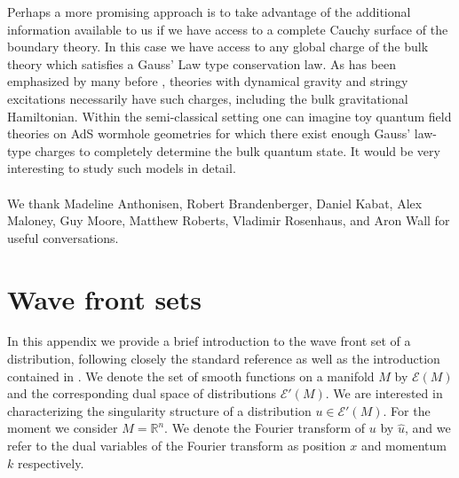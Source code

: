 \documentclass[12pt]{article}
\numberwithin{equation}{section}
\def\Reals{\mathbb{R}}
\begin{document}
Perhaps a more promising approach is to take advantage of the
additional information available to us if we have access to a complete
Cauchy surface of the boundary theory. In this case we have access 
to any global charge of the bulk theory which satisfies a Gauss' Law 
type conservation law. 
As has been emphasized by many before
\cite{Balasubramanian:2006aa,Balasubramanian:2006ab,Marolf:2008mf,Marolf:2008mg,Marolf:2013iba},
theories with dynamical gravity and stringy excitations necessarily
have such charges, including the bulk gravitational Hamiltonian.
Within the semi-classical setting one can imagine toy 
quantum field theories on AdS wormhole geometries
for which there exist enough Gauss' law-type charges to completely 
determine the bulk quantum state. It would be very interesting
to study such models in detail.\\


 \\

We thank Madeline Anthonisen, Robert Brandenberger, Daniel Kabat, Alex Maloney, 
Guy Moore, Matthew Roberts, Vladimir Rosenhaus, and Aron Wall for 
useful conversations. 




\appendix


\section{Wave front sets}
\label{app:WF}


In this appendix we provide a brief introduction to the 
wave front set of a distribution, following closely the standard
reference \cite{Hormander:1990aa} as well as the introduction
contained in \cite{Brunetti:1995rf}.
We denote the set of smooth functions on a manifold $M$ by
$\mathcal{E}(M)$ and the corresponding dual space of distributions
$\mathcal{E}'(M)$. 
We are interested in characterizing the singularity structure of 
a distribution $u \in \mathcal{E}'(M)$. 
For the moment we consider $M = \Reals^n$.
We denote the Fourier transform of $u$ by $\hat{u}$, and we refer 
to the dual variables of the Fourier transform as position 
$x$ and momentum $k$ respectively.
\end{document}
